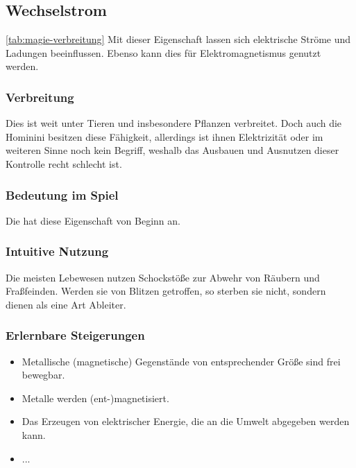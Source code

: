 \subsection{Wechselstrom}\label{sec:wechselstrommagie} \ref{tab:magie-verbreitung} %
Mit dieser Eigenschaft lassen sich elektrische Ströme und Ladungen beeinflussen. Ebenso kann dies für Elektromagnetismus genutzt werden.

\subsubsection{Verbreitung}
Dies ist weit unter Tieren und insbesondere Pflanzen verbreitet. Doch auch die Hominini besitzen diese Fähigkeit, allerdings ist ihnen Elektrizität oder im weiteren Sinne noch kein Begriff, weshalb das Ausbauen und Ausnutzen dieser Kontrolle recht schlecht ist.

\subsubsection{Bedeutung im Spiel}
Die  hat diese Eigenschaft von Beginn an. 

\subsubsection{Intuitive Nutzung}
Die meisten Lebewesen nutzen Schockstöße zur Abwehr von Räubern und Fraßfeinden. Werden sie von Blitzen getroffen, so sterben sie nicht, sondern dienen als eine Art Ableiter. 

\subsubsection{Erlernbare Steigerungen}
\begin{itemize}
	\item Metallische (magnetische) Gegenstände von entsprechender Größe sind frei bewegbar.
	\item Metalle werden (ent-)magnetisiert.
	\item Das Erzeugen von elektrischer Energie, die an die Umwelt abgegeben werden kann.
	\item ...
\end{itemize}

